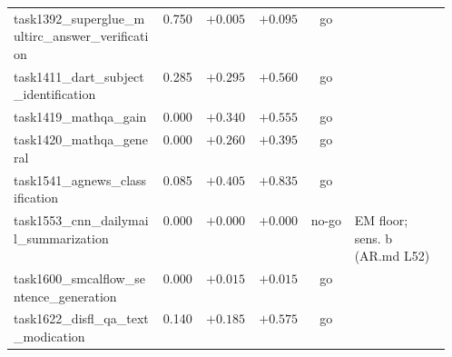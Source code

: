 \begin{longtable}{@{}p{0.34\linewidth}rrrcp{0.22\linewidth}@{}}
\scriptsize task1392\_\hspace{0pt}superglue\_\hspace{0pt}multirc\_\hspace{0pt}answer\_\hspace{0pt}verification & \scriptsize 0.750 & \scriptsize $+0.005$ & \scriptsize $+0.095$ & \scriptsize go & \scriptsize  \\
\scriptsize task1411\_\hspace{0pt}dart\_\hspace{0pt}subject\_\hspace{0pt}identification & \scriptsize 0.285 & \scriptsize $+0.295$ & \scriptsize $+0.560$ & \scriptsize go & \scriptsize  \\
\scriptsize task1419\_\hspace{0pt}mathqa\_\hspace{0pt}gain & \scriptsize 0.000 & \scriptsize $+0.340$ & \scriptsize $+0.555$ & \scriptsize go & \scriptsize  \\
\scriptsize task1420\_\hspace{0pt}mathqa\_\hspace{0pt}general & \scriptsize 0.000 & \scriptsize $+0.260$ & \scriptsize $+0.395$ & \scriptsize go & \scriptsize  \\
\scriptsize task1541\_\hspace{0pt}agnews\_\hspace{0pt}classification & \scriptsize 0.085 & \scriptsize $+0.405$ & \scriptsize $+0.835$ & \scriptsize go & \scriptsize  \\
\scriptsize task1553\_\hspace{0pt}cnn\_\hspace{0pt}dailymail\_\hspace{0pt}summarization & \scriptsize 0.000 & \scriptsize $+0.000$ & \scriptsize $+0.000$ & \scriptsize no-go & \scriptsize EM floor; sens. b (AR.md L52) \\
\scriptsize task1600\_\hspace{0pt}smcalflow\_\hspace{0pt}sentence\_\hspace{0pt}generation & \scriptsize 0.000 & \scriptsize $+0.015$ & \scriptsize $+0.015$ & \scriptsize go & \scriptsize  \\
\scriptsize task1622\_\hspace{0pt}disfl\_\hspace{0pt}qa\_\hspace{0pt}text\_\hspace{0pt}modication & \scriptsize 0.140 & \scriptsize $+0.185$ & \scriptsize $+0.575$ & \scriptsize go & \scriptsize  \\

\end{longtable}
